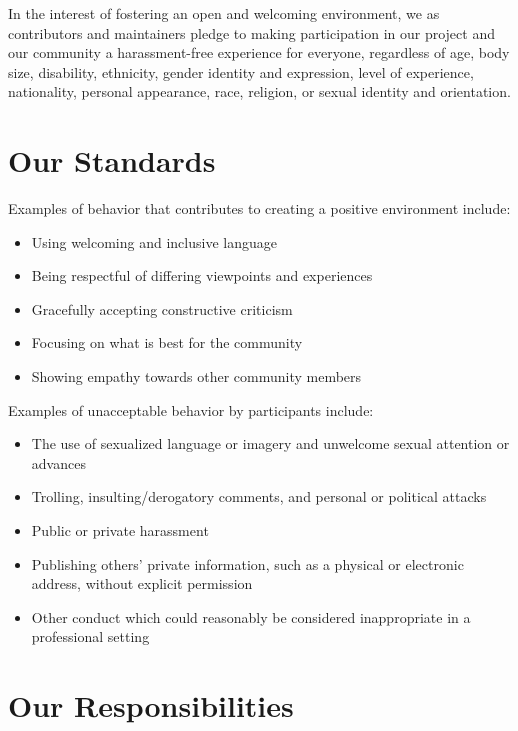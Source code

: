 \documentclass[
  letterpaper,
  oneside,
  open=any]{scrbook}
\providecommand{\tightlist}{%
  \setlength{\itemsep}{0pt}\setlength{\parskip}{0pt}}\usepackage{longtable,booktabs,array}
\begin{document}
In the interest of fostering an open and welcoming environment, we as
contributors and maintainers pledge to making participation in our
project and our community a harassment-free experience for everyone,
regardless of age, body size, disability, ethnicity, gender identity and
expression, level of experience, nationality, personal appearance, race,
religion, or sexual identity and orientation.

\section{Our Standards}\label{our-standards}

Examples of behavior that contributes to creating a positive environment
include:

\begin{itemize}
\tightlist
\item
  Using welcoming and inclusive language
\item
  Being respectful of differing viewpoints and experiences
\item
  Gracefully accepting constructive criticism
\item
  Focusing on what is best for the community
\item
  Showing empathy towards other community members
\end{itemize}

Examples of unacceptable behavior by participants include:

\begin{itemize}
\tightlist
\item
  The use of sexualized language or imagery and unwelcome sexual
  attention or advances
\item
  Trolling, insulting/derogatory comments, and personal or political
  attacks
\item
  Public or private harassment
\item
  Publishing others' private information, such as a physical or
  electronic address, without explicit permission
\item
  Other conduct which could reasonably be considered inappropriate in a
  professional setting
\end{itemize}

\section{Our Responsibilities}\label{our-responsibilities}
\end{document}
